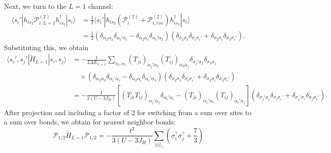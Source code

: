 \documentclass[11pt, a4paper]{article}
\begin{document}
Next, we turn to the $L=1$ channel:
\begin{align}
\langle s_i' | h_{is_2} \mathcal{P}_{i, L=1}^{(2)} h_{is_3}^{\dagger} | s_i \rangle &= \frac{1}{2} \langle s_i' | h_{is_2} (\mathcal{P}_i^{(2)} + \mathcal{P}_{i, exc}^{(2)}) h_{is_3}^{\dagger} | s_i \rangle \nonumber \\
&= \frac{1}{2} (\delta_{\alpha_2 \alpha_3} \delta_{\alpha_i' \alpha_i} - \delta_{\alpha_2 \alpha_i} \delta_{\alpha_i' \alpha_3}) (\delta_{\sigma_2 \sigma_3} \delta_{\sigma_i \sigma_i'} + \delta_{\sigma_2 \sigma_i} \delta_{\sigma_3 \sigma_i'}).
\end{align}
Substituting this, we obtain
\begin{align}
\langle s_i', s_j' | \tilde{H}_{L=1} | s_i, s_j \rangle &= -\frac{1}{2\Delta E_{L=1}} \sum_{s_2, s_3} (T_{ji})_{\alpha_j' \alpha_2} (T_{ij})_{\alpha_3 \alpha_j} \delta_{\sigma_j' \sigma_2} \delta_{\sigma_3 \sigma_j} \nonumber \\
&\quad \times (\delta_{\alpha_2 \alpha_3} \delta_{\alpha_i' \alpha_i} - \delta_{\alpha_2 \alpha_i} \delta_{\alpha_i' \alpha_3}) (\delta_{\sigma_2 \sigma_3} \delta_{\sigma_i \sigma_i'} + \delta_{\sigma_2 \sigma_i} \delta_{\sigma_3 \sigma_i'}) \nonumber \\
&= -\frac{1}{2(U-3J_H)} [(T_{ji} T_{ij})_{\alpha_j' \alpha_j} \delta_{\alpha_i' \alpha_i} - (T_{ji})_{\alpha_j' \alpha_i} (T_{ij})_{\alpha_i' \alpha_j}] (\delta_{\sigma_j' \sigma_j} \delta_{\sigma_i \sigma_i'} + \delta_{\sigma_j' \sigma_i} \delta_{\sigma_j \sigma_i'}).
\end{align}
After projection and including a factor of 2 for switching from a sum over sites to a sum over bonds, we obtain for nearest neighbor bonds:
\begin{equation}
\mathcal{P}_{1/2} \tilde{H}_{L=1} \mathcal{P}_{1/2} = -\frac{t^2}{3(U-3J_H)} \sum_{\langle ij \rangle_{\gamma}} \left( \sigma_i^{\gamma} \sigma_j^{\gamma} + \frac{7}{3} \right)
\end{equation}
\end{document}

